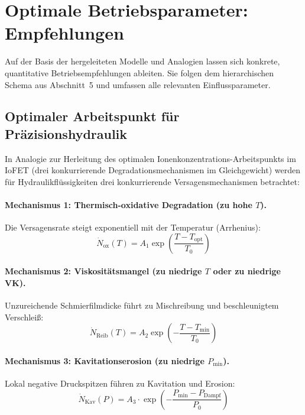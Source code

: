 ﻿\documentclass[a4paper,12pt]{scrreprt}
\theoremstyle{definition}
\begin{document}
\section{Optimale Betriebsparameter: Empfehlungen}

Auf der Basis der hergeleiteten Modelle und Analogien lassen sich
konkrete, quantitative Betriebsempfehlungen ableiten. Sie folgen dem
hierarchischen Schema aus Abschnitt~5 und umfassen alle relevanten
Einflussparameter.

\subsection{Optimaler Arbeitspunkt für Präzisionshydraulik}

In Analogie zur Herleitung des optimalen Ionenkonzentrations-Arbeitspunkts
im IoFET (drei konkurrierende Degradationsmechanismen im Gleichgewicht)
werden für Hydraulikflüssigkeiten drei konkurrierende Versagensmechanismen
betrachtet:

\paragraph{Mechanismus 1: Thermisch-oxidative Degradation (zu hohe $T$).}
Die Versagensrate steigt exponentiell mit der Temperatur (Arrhenius):
\begin{equation}
  \dot{N}_{\mathrm{ox}}(T) = A_1 \exp\!\left(\frac{T - T_{\mathrm{opt}}}{T_0}\right)
  \label{eq:versagen_ox}
\end{equation}

\paragraph{Mechanismus 2: Viskositätsmangel (zu niedrige $T$ oder zu niedrige VK).}
Unzureichende Schmierfilmdicke führt zu Mischreibung und beschleunigtem
Verschleiß:
\begin{equation}
  \dot{N}_{\mathrm{Reib}}(T) = A_2 \exp\!\left(-\frac{T - T_{\mathrm{min}}}{T_0}\right)
  \label{eq:versagen_reib}
\end{equation}

\paragraph{Mechanismus 3: Kavitationserosion (zu niedrige $P_{\min}$).}
Lokal negative Druckspitzen führen zu Kavitation und Erosion:
\begin{equation}
  \dot{N}_{\mathrm{Kav}}(P) = A_3 \cdot
    \exp\!\left(-\frac{P_{\min} - P_{\mathrm{Dampf}}}{P_0}\right)
  \label{eq:versagen_kav}
\end{equation}
\end{document}
